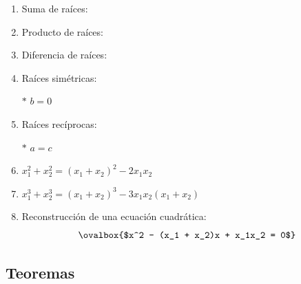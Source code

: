 \documentclass[11pt,a4paper]{article}
\begin{document}
\begin{minipage}[t]{0.504\textwidth}
\begin{enumerate}
  \item Suma de raíces: \ 
  \item Producto de raíces: \ 
  \item Diferencia de raíces: \ 

  \item Raíces simétricas: \ 

  \textcolor{rojo}{$\ast$} $b = 0$
\end{enumerate}
\end{minipage}\hfill
\begin{minipage}[t]{0.466\textwidth}
\begin{enumerate}\setcounter{enumi}{4}
  \item Raíces recíprocas: \ 

  \textcolor{rojo}{$\ast$} $a = c$
  \item $x_1^2 + x_2^2 = (x_1 + x_2)^2 - 2x_1x_2$
  \item $x_1^3 + x_2^3 = (x_1 + x_2)^3 - 3x_1x_2(x_1 + x_2)$
  \item Reconstrucción de una ecuación cuadrática:
  \[\ovalbox{$x^2 - (x_1 + x_2)x + x_1x_2 = 0$}\]
\end{enumerate}
\end{minipage}

\subsection*{Teoremas}
\end{document}
